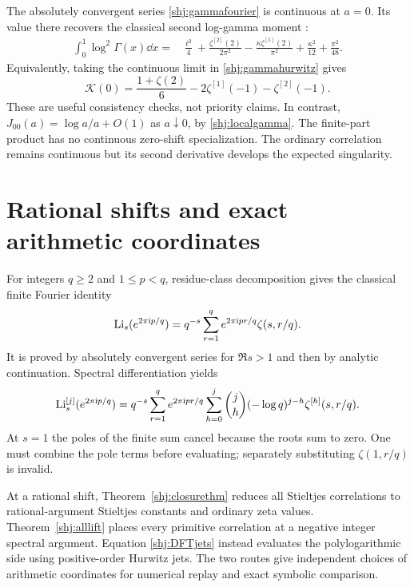 The absolutely convergent series \eqref{shj:gammafourier} is continuous at $a=0$. Its value there recovers the classical second log-gamma moment \cite{stieltjes:EspinosaMoll1}:
\begin{align}
\int_0^1\log^2\Gamma(x)\dd x={}&
\frac{\ell^2}{4}+\frac{\zeta^{[2]}(2)}{2\pi^2}
-\frac{\kappa\zeta^{[1]}(2)}{\pi^2}
+\frac{\kappa^2}{12}+\frac{\pi^2}{48}.
\label{shj:classicalmoment}
\end{align}
Equivalently, taking the continuous limit in \eqref{shj:gammahurwitz} gives
\[
\mathcal K(0)=\frac{1+\zeta(2)}6-2\zeta^{[1]}(-1)-\zeta^{[2]}(-1).
\]
These are useful consistency checks, not priority claims. In contrast,
$J_{00}(a)=\log a/a+O(1)$ as $a\downarrow0$, by \eqref{shj:localgamma}. The finite-part product has no continuous zero-shift specialization. The ordinary correlation remains continuous but its second derivative develops the expected singularity.

\section{Rational shifts and exact arithmetic coordinates}\label{shj:rationals}
For integers $q\ge2$ and $1\le p<q$, residue-class decomposition gives the classical finite Fourier identity
\begin{equation}\label{shj:DFT}
\operatorname{Li}_s(e^{2\pi\mathrm{i} p/q})
=q^{-s}\sum_{r=1}^q e^{2\pi\mathrm{i} pr/q}\zeta(s,r/q).
\end{equation}
It is proved by absolutely convergent series for $\Re s>1$ and then by analytic continuation. Spectral differentiation yields
\begin{align}
\operatorname{Li}_s^{[j]}(e^{2\pi\mathrm{i} p/q})
=q^{-s}\sum_{r=1}^q e^{2\pi\mathrm{i} pr/q}
\sum_{h=0}^j\binom jh(-\log q)^{j-h}\zeta^{[h]}(s,r/q).
\label{shj:DFTjets}
\end{align}
At $s=1$ the poles of the finite sum cancel because the roots sum to zero. One must combine the pole terms before evaluating; separately substituting $\zeta(1,r/q)$ is invalid.

At a rational shift, Theorem~\ref{shj:closurethm} reduces all Stieltjes correlations to rational-argument Stieltjes constants and ordinary zeta values. Theorem~\ref{shj:alllift} places every primitive correlation at a negative integer spectral argument. Equation \eqref{shj:DFTjets} instead evaluates the polylogarithmic side using positive-order Hurwitz jets. The two routes give independent choices of arithmetic coordinates for numerical replay and exact symbolic comparison.

